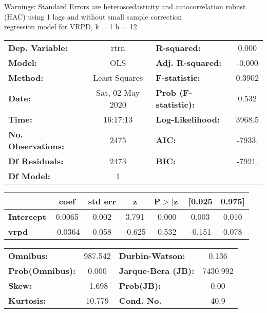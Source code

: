 Warnings: \newline
 [1] Standard Errors are heteroscedasticity and autocorrelation robust (HAC) using 1 lags and without small sample correction\\ 

regression model for VRPD, k = 1 h = 12\begin{center}
\begin{tabular}{lclc}
\toprule
\textbf{Dep. Variable:}    &       rtrn       & \textbf{  R-squared:         } &     0.000   \\
\textbf{Model:}            &       OLS        & \textbf{  Adj. R-squared:    } &    -0.000   \\
\textbf{Method:}           &  Least Squares   & \textbf{  F-statistic:       } &    0.3902   \\
\textbf{Date:}             & Sat, 02 May 2020 & \textbf{  Prob (F-statistic):} &    0.532    \\
\textbf{Time:}             &     16:17:13     & \textbf{  Log-Likelihood:    } &    3968.5   \\
\textbf{No. Observations:} &        2475      & \textbf{  AIC:               } &    -7933.   \\
\textbf{Df Residuals:}     &        2473      & \textbf{  BIC:               } &    -7921.   \\
\textbf{Df Model:}         &           1      & \textbf{                     } &             \\
\bottomrule
\end{tabular}
\begin{tabular}{lcccccc}
                   & \textbf{coef} & \textbf{std err} & \textbf{z} & \textbf{P$> |$z$|$} & \textbf{[0.025} & \textbf{0.975]}  \\
\midrule
\textbf{Intercept} &       0.0065  &        0.002     &     3.791  &         0.000        &        0.003    &        0.010     \\
\textbf{vrpd}      &      -0.0364  &        0.058     &    -0.625  &         0.532        &       -0.151    &        0.078     \\
\bottomrule
\end{tabular}
\begin{tabular}{lclc}
\textbf{Omnibus:}       & 987.542 & \textbf{  Durbin-Watson:     } &    0.136  \\
\textbf{Prob(Omnibus):} &   0.000 & \textbf{  Jarque-Bera (JB):  } & 7430.992  \\
\textbf{Skew:}          &  -1.698 & \textbf{  Prob(JB):          } &     0.00  \\
\textbf{Kurtosis:}      &  10.779 & \textbf{  Cond. No.          } &     40.9  \\
\bottomrule
\end{tabular}
\end{center}

